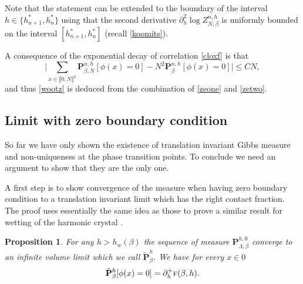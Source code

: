 \documentclass[JEP,XML,SOM,Unicode, NoFloatCountersInSection]{cedram}
\numberwithin{equation}{section}
\theoremstyle{plain}
\newtheorem{proposition}[theorem]{Proposition}
\theoremstyle{definition}
\newcommand{\lint}{\llbracket}
\newcommand{\rint}{\rrbracket}
\newcommand{\bP}{{\ensuremath{\mathbf P}} }
\newcommand{\gb}{\beta}
\newcommand{\gL}{\Lambda}
\newcommand{\tf}{\textsc{f}}
\begin{document}
Note that the statement can be extended to the boundary of the interval $h\in\{h^*_{n+1},h^*_n\}$ using that
the second derivative $\partial^2_h \log Z^{n,h}_{N,\gb}$ is uniformly bounded on the interval $[h^*_{n+1},h^*_n]$ (recall \eqref{koomits}).

A consequence of the exponential decay of correlation \eqref{cloxf} is that
\begin{equation}\label{zetwo}
\biggl|\sum_{x\in \lint 0,N \rint^2 }\bP^{n,h}_{\gb,N}[\phi(x)=0]- N^2\bP^{n,h}_{\gb}[\phi(x)=0]\biggr|\le C N,
\end{equation}
and thus \eqref{wootz} is deduced from the combination of \eqref{zeone} and \eqref{zetwo}.

\subsection{Limit with zero boundary condition}\label{zerob}

So far we have only shown the existence of translation invariant Gibbs measure and non-uniqueness at the phase transition points.
To conclude we need an argument to show that they are the only one.

A first step is to show convergence of the measure when having zero boundary condition to a translation invariant limit which has the right contact fraction.
The proof uses essentially the same idea as those to prove a similar result for wetting of the harmonic crystal
\cite[\S 5]{cf:GL}.

\begin{proposition}
For any $h>h_w(\gb)$
the sequence of measure $\bP^{h,0}_{\gL,\gb}$ converge to an infinite volume limit which we call $\tilde \bP^{h}_{\gb}$.
We have for every $x\in 0$
\begin{equation}\label{zioup}
\tilde \bP^{h}_{\gb}[\phi(x)=0]=\partial^+_h \tf(\gb,h).
\end{equation}
\end{proposition}
\end{document}
